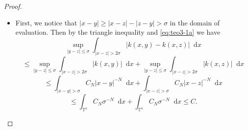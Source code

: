\documentclass[10pt,a4paper]{amsart}
\newcommand*\diff{\mathop{}\!\mathrm{d}}
\begin{document}
\begin{proof}
    \begin{itemize}
        \item[(a)] First, we notice that $|x-y| \geq |x - z| - |z - y| > \sigma$ in the domain of evaluation. Then by the triangle inequality and \cref{eq:teo3-1a} we have
        \begin{equation*}
            \sup_{|y-z| \leq \sigma} \int_{|x-z| > 2\sigma}|k(x, y) - k(x, z)|\diff x  
        \end{equation*}
        \begin{equation*}
            \leq \sup_{|y-z| \leq \sigma} \int_{|x-z| > 2\sigma}|k(x, y)|\diff x + \sup_{|y-z| \leq \sigma} \int_{|x-z| > 2\sigma}|k(x, z)|\diff x
        \end{equation*}
        \begin{equation*}
            \leq  \int_{|x-y|>\sigma} C_N|x-y|^{-N} \diff x + \int_{|x-z|>\sigma} C_N|x-z|^{-N} \diff x
        \end{equation*}
        \begin{equation*}
            \leq  \int_{\mathbb{T}^n} C_N\sigma^{-N} \diff x + \int_{\mathbb{T}^n} C_N\sigma^{-N} \diff x \leq C.
        \end{equation*}


\end{itemize}
\end{proof}
\end{document}
